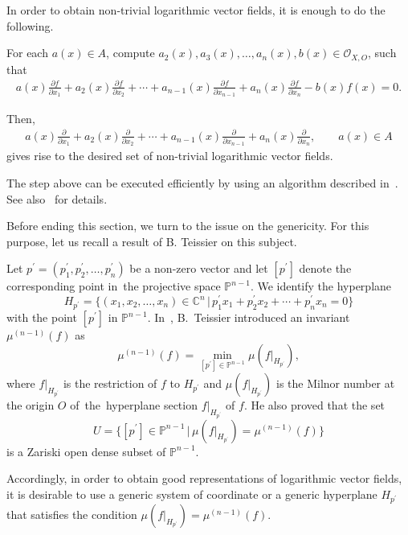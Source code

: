 \documentclass[10pt,a4paper]{amsart}
\numberwithin{equation}{section}
\begin{document}
In order to obtain non-trivial logarithmic vector fields, it is enough to do the following.

For each $a(x) \in A$, compute $a_2(x), a_3(x),\ldots,a_n(x), b(x) \in {\mathcal O}_{X,O}$, such that
\begin{gather*}
a(x)\frac{\partial f}{\partial x_1} + a_2(x)\frac{\partial f}{\partial x_2} + \cdots + a_{n-1}(x)\frac{\partial f}{\partial x_{n-1}}+ a_n(x)\frac{\partial f}{\partial x_n} - b(x)f(x) =0.
\end{gather*}

{\samepage
Then,
\begin{gather*}
a(x)\frac{\partial }{\partial x_1} + a_2(x)\frac{\partial }{\partial x_2} + \cdots + a_{n-1}(x)\frac{\partial }{\partial x_{n-1}}+ a_n(x)\frac{\partial }{\partial x_n}, \qquad a(x) \in A
\end{gather*}
gives rise to the desired set of non-trivial logarithmic vector fields.

}

The step above can be executed efficiently by using an algorithm described in~\cite{NT16b}. See also~\cite{TN20} for details.


Before ending this section, we turn to the issue on the genericity. For this purpose, let us recall a result of B. Teissier on this subject.

Let $ p^{\prime}= (p_1^{\prime}, p_2^{\prime}, \dots, p_n^{\prime}) $ be a non-zero vector and let $ [p^{\prime}] $ denote
the corresponding point in~the projective space $ {\mathbb P}^{n-1}$. We identify the hyperplane
\[
H_{p^{\prime}} = \big\{ (x_1,x_2,\dots, x_n) \in {\mathbb C}^{n} \,|\, p_1^{\prime}x_1+p_2^{\prime}x_2+ \cdots + p_n^{\prime}x_n =0 \big\}
\]
with the point $ [p^{\prime}] $ in $ {\mathbb P}^{n-1}$.
In~\cite{Te73, Te77}, B.~Teissier introduced an invariant $ \mu^{(n-1)}(f) $ as
\[
\mu^{(n-1)}(f) = \min_{[p^{\prime}] \in {\mathbb P}^{n-1}} \mu(f|_{H_{p^{\prime}}}),
\]
where $ f|_{H_{p^{\prime}}} $ is the restriction of $f$ to $ H_{p^{\prime}} $ and
$ \mu(f|_{H_{p^{\prime}}}) $ is the Milnor number at the origin $O$ of~the~hyperplane section $ f|_{H_{p^{\prime}}} $ of $f $.
He also proved that the set
\[
U=\big\{[p^{\prime}] \in {\mathbb P}^{n-1} \,|\, \mu(f|_{H_{p^{\prime}}}) = \mu^{(n-1)}(f)\big\}
\]
is a Zariski open dense subset of $ {\mathbb P}^{n-1}$.

Accordingly, in order to obtain good representations of logarithmic vector fields, it is desirable to use a generic system of coordinate or a generic hyperplane $H_{p^{\prime}}$ that satisfies the condition $\mu(f|_{H_{p^{\prime}}}) = \mu^{(n-1)}(f)$.
\end{document}
